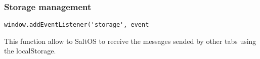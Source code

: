 \documentclass[a4paper]{article}
\begin{document}
\hypertarget{toc869}{}
\subsubsection{Storage management}

\begin{lstlisting}
window.addEventListener('storage', event
\end{lstlisting}

This function allow to SaltOS to receive the messages sended by other tabs
using the localStorage.

\end{document}

